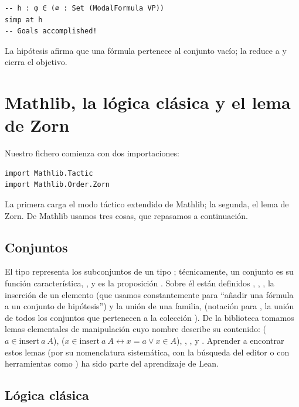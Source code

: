 \begin{lstlisting}
-- h : φ ∈ (∅ : Set (ModalFormula VP))
simp at h
-- Goals accomplished!
\end{lstlisting}

La hipótesis afirma que una fórmula pertenece al conjunto vacío;  la reduce a  y cierra el objetivo.

\section{Mathlib, la lógica clásica y el lema de Zorn}\label{sec:mathlib}

Nuestro fichero comienza con dos importaciones:

\begin{lstlisting}
import Mathlib.Tactic
import Mathlib.Order.Zorn
\end{lstlisting}

La primera carga el modo táctico extendido de Mathlib; la segunda, el lema de Zorn. De Mathlib usamos tres cosas, que repasamos a continuación.

\subsection*{Conjuntos}

El tipo  representa los subconjuntos de un tipo ; técnicamente, un conjunto es su función característica, , y  es la proposición . Sobre él están definidos , , , la inserción de un elemento  (que usamos constantemente para ``añadir una fórmula a un conjunto de hipótesis'') y la unión de una familia,  (notación para , la unión de todos los conjuntos que pertenecen a la colección ). De la biblioteca tomamos lemas elementales de manipulación cuyo nombre describe su contenido:  ($a \in \mathrm{insert}\ a\ A$),  ($x \in \mathrm{insert}\ a\ A \leftrightarrow x = a \lor x \in A$), , ,  y . Aprender a encontrar estos lemas (por su nomenclatura sistemática, con la búsqueda del editor o con herramientas como ) ha sido parte del aprendizaje de Lean.

\subsection*{Lógica clásica}

